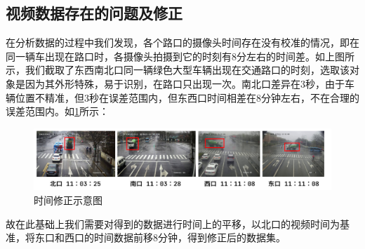 \subsection{视频数据存在的问题及修正}
在分析数据的过程中我们发现，各个路口的摄像头时间存在没有校准的情况，即在同一辆车出现在路口时，各摄像头拍摄到它的时刻有8分左右的时间差。如上图所示，我们截取了东西南北口同一辆绿色大型车辆出现在交通路口的时刻，选取该对象是因为其外形特殊，易于识别，在路口只出现一次。南北口差异在3秒，由于车辆位置不精准，但3秒在误差范围内，但东西口时间相差在8分钟左右，不在合理的误差范围内。如\ref{fig:time}所示：
\begin{figure}[h]
    \centering
    \includegraphics[scale=0.8]{figures/time.jpg}
    \caption{时间修正示意图}
    \label{fig:time}
\end{figure}
故在此基础上我们需要对得到的数据进行时间上的平移，以北口的视频时间为基准，将东口和西口的时间数据前移8分钟，得到修正后的数据集。
